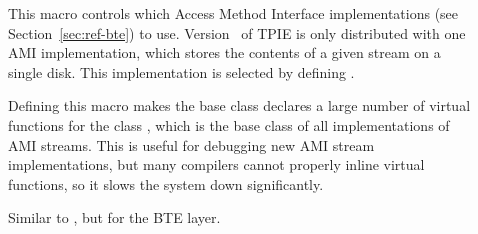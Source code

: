 \begin{description}
\item[{}] This macro controls which Access Method
Interface implementations (see Section~\ref{sec:ref-bte}) to use. Version
\version~of TPIE is only distributed with one AMI implementation, which stores
the contents of a given stream on a single disk. This implementation is
selected by defining .


\item[{}] Defining this macro makes the base class
declares a large number of virtual functions for the class
, which is the base class of all implementations of
AMI streams. This is useful for debugging new AMI stream implementations,
but many compilers cannot properly inline virtual functions, so it slows
the system down significantly.


\item[{}] Similar to , but
for the BTE layer.
  

%
%



\end{description}
